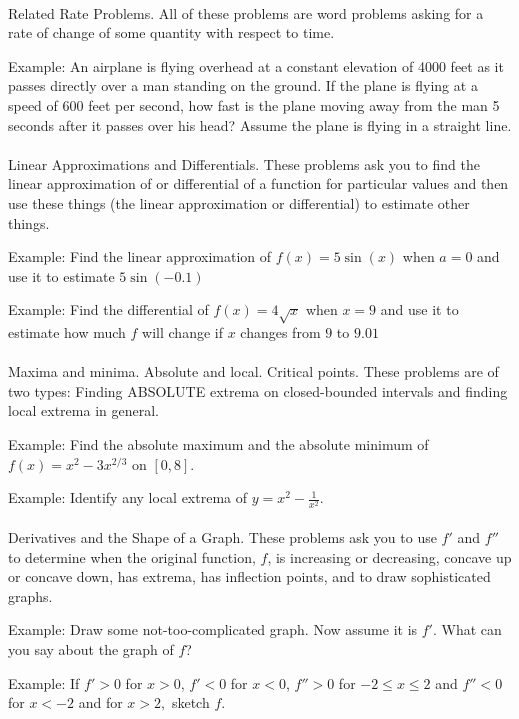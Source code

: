 \documentclass[11pt,fleqn]{article}
\begin{document}
\noindent {}\\
Related Rate Problems. All of these problems are word problems asking for a rate of change of some quantity with respect to time. 

Example:  An airplane is flying overhead at a constant elevation of 4000 feet as it passes directly over a man standing on the ground. If the plane is flying at a speed of 600 feet per second, how fast is the plane moving away from the man 5 seconds after it passes over his head? Assume the plane is flying in a straight line.\\

\noindent {}\\
Linear Approximations and Differentials. These problems ask you to find the linear approximation of or differential of a function for particular values and then use these things (the linear approximation or differential) to estimate other things.

Example:  Find the linear approximation of $f(x)=5 \sin (x)$ when $a=0$ and use it to estimate $5 \sin (-0.1)$

Example:  Find the differential of $f(x)=4 \sqrt{x}$ when $x=9$ and use it to estimate  how much $f$ will change if $x$ changes from $9$ to $9.01$\\


\noindent {}\\
Maxima and minima. Absolute and local. Critical points. These problems are of two types: Finding ABSOLUTE extrema on closed-bounded intervals and finding local extrema in general.

Example: Find the absolute maximum and the absolute minimum of $f(x)=x^2-3x^{2/3}$ on $[0,8].$

Example: Identify any local extrema of $y=x^2- \frac{1}{x^2}.$\\

\noindent {}\\
Derivatives and the Shape of a Graph. These problems ask you to use $f'$ and $f''$ to determine when the original function, $f$, is increasing or decreasing, concave up or concave down, has extrema, has inflection points, and to draw sophisticated graphs.

Example: Draw some not-too-complicated graph. Now assume it is $f'$. What can you say about the graph of $f$?

Example: If $f' >0$ for $x>0$, $f' <0$ for $x<0$, $f'' > 0$ for $-2 \leq x \leq 2$ and $f'' < 0$ for $x<-2$ and for $x>2,$ sketch $f.$\\
\end{document}
